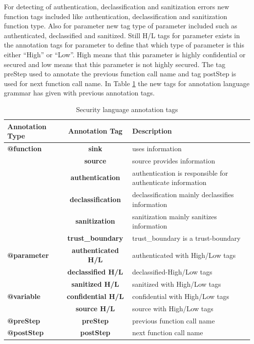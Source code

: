 For detecting of authentication, declassification and sanitization errors new function tags included like authentication, declassification and sanitization function type. Also for parameter new tag type of parameter included such as authenticated, declassified and sanitized. Still H/L tags for parameter exists in the annotation tags for parameter to define that which type of parameter is this either \enquote{High} or \enquote{Low}. High means that this parameter is highly confidential or secured and low means that this parameter is not highly secured. The tag preStep used to annotate the previous function call name and tag postStep is used for next function call name. In Table \ref{table:Security_language_annotation_tags} the new tags for annotation language grammar has given with previous \cite{ref_108_paul2015infoflow} annotation tags. 

\begin{table}
	\centering
\begin{tabular}{|l|c|p{5cm}|}
	\hline
	\textbf{Annotation Type} & \textbf{Annotation Tag} & \textbf{Description}\\
	\hline

	\textbf{@function}& \textbf{sink} & uses information \\
	                  & \textbf{source}& source provides information	\\
	                  & \textbf{authentication} & authentication is responsible for authenticate information	\\
	                  & \textbf{declassification}& declassification mainly declassifies information	\\
	                  & \textbf{sanitization}   & sanitization mainly sanitizes information	\\
	                  & \textbf{trust\_boundary}& trust\_boundary is a trust-boundary\\ \hline

	\textbf{@parameter}        & \textbf{authenticated H/L}& authenticated with High/Low tags\\
					  & \textbf{declassified H/L}  & declassified-High/Low tags    \\
				      & \textbf{sanitized H/L}     & sanitized with High/Low tags    \\ \hline
	\textbf{@variable}         & \textbf{confidential H/L} & confidential with High/Low tags\\
					  & \textbf{source H/L} & source with High/Low tags   \\
	\hline
	
	\textbf{@preStep}         & \textbf{preStep}  & previous function call name\\ 	\hline
	\textbf{@postStep}        & \textbf{postStep}  & next function call name\\ 	\hline

	
\end{tabular}
\caption{Security language annotation tags}
\label{table:Security_language_annotation_tags}
\end{table}

